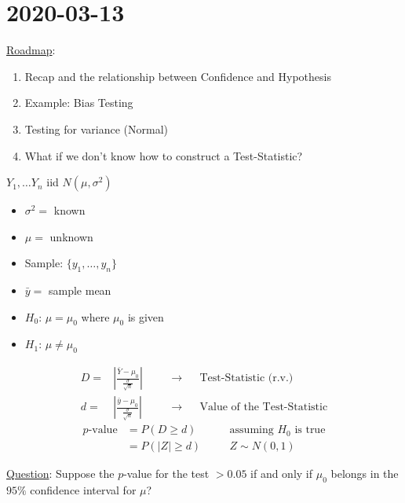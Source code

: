 \section{2020-03-13}
\underline{Roadmap}:
\begin{enumerate}[label=(\roman*)]
    \item Recap and the relationship between Confidence and Hypothesis
    \item Example: Bias Testing
    \item Testing for variance (Normal)
    \item What if we don't know how to construct a Test-Statistic?
\end{enumerate}


\begin{Example}{}{}
    $ Y_1,\ldots Y_n $ iid $ N(\mu,\sigma^2) $
    \begin{itemize}
        \item $ \sigma^2= $ known
        \item $ \mu= $ unknown
        \item Sample: $ \{y_1,\ldots ,y_n\} $
        \item $ \bar{y}= $ sample mean
        \item $ H_0 $: $ \mu=\mu_0 $ where $ \mu_0 $ is given
        \item $ H_1 $: $ \mu \neq \mu_0 $
    \end{itemize}
    \[
        \begin{aligned}
            D= & \left|\frac{\bar{Y}-\mu_0}{\frac{\sigma}{\sqrt{n}}} \right|
               & \quad                                                       & \rightarrow &  & \text{Test-Statistic (r.v.)}       \\
            d= & \left|\frac{\bar{y}-\mu_0}{\frac{\sigma}{\sqrt{n}}} \right|
               &                                                             & \rightarrow &  & \text{Value of the Test-Statistic}
        \end{aligned}
    \]
    \[
        \begin{aligned}
            p\text{-value}
             & =P(D\geqslant d)   & \quad & \text{assuming }H_0\text{ is true} \\
             & =P(|Z|\geqslant d) &       & Z \sim N(0,1)
        \end{aligned}
    \]
\end{Example}

\underline{Question}: Suppose the $ p $-value for the test $ >0.05 $
if and only if $ \mu_0 $ belongs in the $ 95\% $ confidence interval for $ \mu $?

